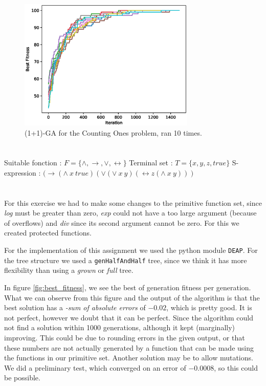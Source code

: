 \documentclass[11pt]{article}
\begin{document}
\begin{figure}[H]
\centering
\includegraphics[width=0.75\textwidth]{images/ga.eps}
\caption{(1+1)-GA for the Counting Ones problem, ran 10 times.}
\label{fig:ga}
\end{figure}

\section{}
Suitable fonction : $F = \{\wedge,\rightarrow, \vee,\leftrightarrow \}$
\newline Terminal set : $T = \{x,y,z,true\}$
\newline S-expression : $ (\rightarrow (\land\ x\ true)(\lor (\lor\ x\ y)(\leftrightarrow z(\land\ x\ y))) $

\section{}
For this exercise we had to make some changes to the primitive function set, since \textit{log} must be greater than zero, \textit{exp} could not have a too large argument (because of overflows) and \textit{div} since its second argument cannot be zero. For this we created protected functions.

For the implementation of this assignment we used the python module \texttt{DEAP}. For the tree structure we used a \texttt{genHalfAndHalf} tree, since we think it has more flexibility than using a \textit{grown} or \textit{full} tree. 

In figure \ref{fig:best_fitness}, we see the best of generation fitness per generation. What we can observe from this figure and the output of the algorithm is that the best solution has a \textit{-sum of absolute errors} of $-0.02$, which is pretty good. It is not perfect, however we doubt that it can be perfect. Since the algorithm could not find a solution within 1000 generations, although it kept (marginally) improving. This could be due to rounding errors in the given output, or that these numbers are not actually generated by a function that can be made using the functions in our primitive set. Another solution may be to allow mutations. We did a preliminary test, which converged on an error of $-0.0008$, so this could be possible.
\end{document}
